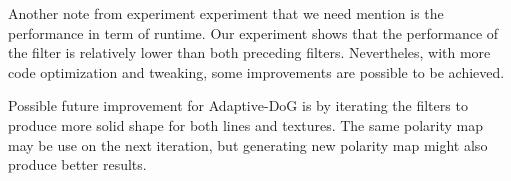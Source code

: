 Another note from experiment experiment that we need mention is the performance in term of runtime. Our experiment shows that the performance of the filter is relatively lower than both preceding filters. Nevertheles, with more code optimization and tweaking, some improvements are possible to be achieved.

Possible future improvement for Adaptive-DoG is by iterating the filters to produce more solid shape for both lines and textures. The same polarity map may be use on the next iteration, but generating new polarity map might also produce better results.


 
